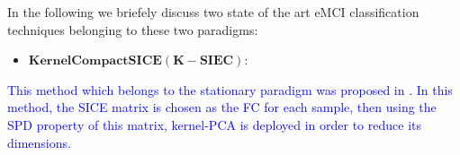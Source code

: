 \documentclass[preprint,12pt]{elsarticle}
\begin{document}
In the following we briefely discuss two state of the art eMCI classification techniques belonging to these two paradigms:














\begin{itemize}
	\item $\mathbf{Kernel Compact SICE(K-SIEC):}$ 
\end{itemize}
\textcolor{blue}{This method which belongs to the stationary paradigm was proposed in \cite{r14}. In this method, the SICE matrix is chosen as the FC for each sample, then using the SPD property of this matrix, kernel-PCA is deployed in order to reduce its dimensions.}
\end{document}
